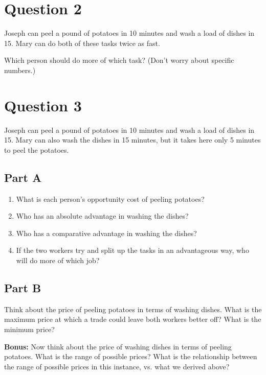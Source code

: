 \documentclass[12pt]{article}
\begin{document}
\section*{Question 2}
Joseph can peel a pound of potatoes in 10 minutes and wash a load of dishes in 15. Mary can do both of these tasks twice as fast. 

\medskip

Which person should do more of which task? (Don't worry about specific numbers.)

\section*{Question 3}
Joseph can peel a pound of potatoes in 10 minutes and wash a load of dishes in 15. Mary can also wash the dishes in 15 minutes, but it takes here only 5 minutes to peel the potatoes. 
    
\subsection*{Part A}
    \begin{enumerate}
        \item What is each person's opportunity cost of peeling potatoes?
        \item Who has an absolute advantage in washing the dishes?
        \item Who has a comparative advantage in washing the dishes?
        \item If the two workers try and split up the tasks in an advantageous way, who will do more of which job?
    \end{enumerate}

\subsection*{Part B}
Think about the price of peeling potatoes in terms of washing dishes. What is the maximum price at which a trade could leave both workers better off? What is the minimum price?

\medskip

\textbf{Bonus:} Now think about the price of washing dishes in terms of peeling potatoes. What is the range of possible prices? What is the relationship between the range of possible prices in this instance, vs. what we derived above?
\end{document}
